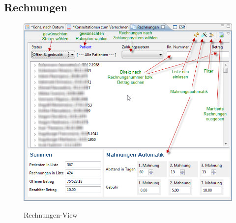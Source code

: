 \subsection{Rechnungen}
\begin{figure}[ht]
  \includegraphics[width=1.0\textwidth]{images/rechnungsview}\\
  \caption{Rechnungen-View}\label{fig:rechnungen}
\end{figure}


